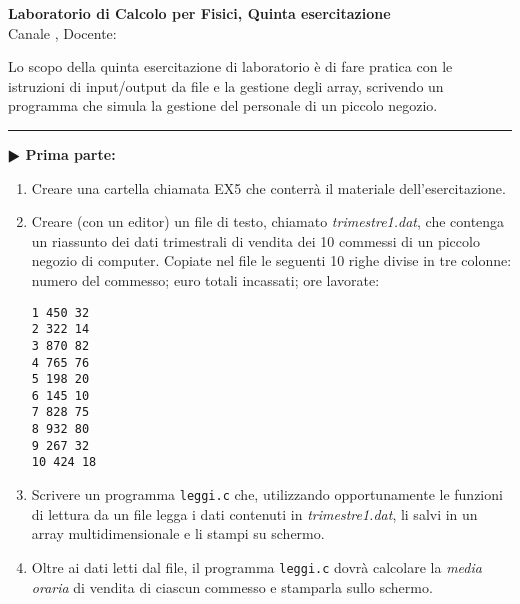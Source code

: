 \documentclass[11pt]{article}
\begin{document}
\pagestyle{empty}

\begin{center}
{\Large \bf  Laboratorio di Calcolo per Fisici, Quinta esercitazione\\[2mm]}
{\large Canale \canale, Docente: \docente}
\end{center}
\vspace{4mm}

\begin{mdframed}[backgroundcolor=panna]
  Lo scopo della quinta esercitazione di laboratorio \`e di fare pratica con
le istruzioni di input/output da file e la gestione degli array, scrivendo un programma
che simula la gestione del personale di un piccolo negozio.
  \end{mdframed}
%
%



\hrule
\vspace{2mm}
\textbf{$\RHD$ Prima parte:}
\begin{enumerate}
\item Creare una cartella chiamata EX5 che conterr\`{a} il materiale dell'esercitazione.
\item Creare (con un editor) un file di testo, chiamato {\em trimestre1.dat}, che 
contenga un riassunto dei dati trimestrali di vendita dei 10 commessi di
un piccolo negozio di computer. Copiate nel file le seguenti 10 righe divise in tre colonne: numero del commesso;  euro totali incassati; ore lavorate:
\begin{mdframed}[backgroundcolor=panna]
\texttt{1    450   32\\
2    322   14\\
3    870   82\\
4    765   76\\
5    198   20\\
6    145   10\\
7    828   75\\
8    932   80\\
9    267   32\\
10   424   18}
\end{mdframed}

\item Scrivere un programma \texttt{leggi.c} che, utilizzando opportunamente le funzioni di lettura da un file 
legga i dati contenuti in {\em trimestre1.dat}, li salvi in un array multidimensionale e li stampi su schermo.

\item Oltre ai dati letti dal file, il programma \texttt{leggi.c} dovrà
calcolare la {\em media oraria\/} di vendita di ciascun commesso e stamparla sullo schermo.
\end{enumerate}
\end{document}
